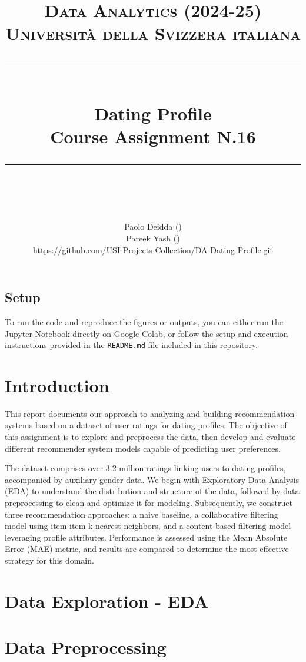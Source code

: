 \documentclass{article}
\title{
	\normalfont\normalsize
	\textsc{Data Analytics (2024-25)\\
	Universit\`a della Svizzera italiana}\\
	\rule{\linewidth}{0.5pt}\\
	{\huge Dating Profile\\
	\small Course Assignment N.16}\\
	\rule{\linewidth}{1pt}\\
	\vspace{5pt}
}
\author{
	Paolo Deidda (\text{paolo.deidda@usi.ch}) \\ 
	Pareek Yash (\text{yash.pareek@usi.ch})\\
	\url{https://github.com/USI-Projects-Collection/DA-Dating-Profile.git}
	}
\begin{document}
\maketitle

\tableofcontents


\vspace*{\fill}

\subsection*{Setup}

To run the code and reproduce the figures or outputs, you can either run the Jupyter Notebook directly on Google Colab, or follow the setup and execution instructions provided in the \texttt{README.md} file included in this repository.

\section*{Introduction}

This report documents our approach to analyzing and building recommendation systems based on a dataset of user ratings for dating profiles. The objective of this assignment is to explore and preprocess the data, then develop and evaluate different recommender system models capable of predicting user preferences.

The dataset comprises over 3.2 million ratings linking users to dating profiles, accompanied by auxiliary gender data. We begin with Exploratory Data Analysis (EDA) to understand the distribution and structure of the data, followed by data preprocessing to clean and optimize it for modeling. Subsequently, we construct three recommendation approaches: a naive baseline, a collaborative filtering model using item-item k-nearest neighbors, and a content-based filtering model leveraging profile attributes. Performance is assessed using the Mean Absolute Error (MAE) metric, and results are compared to determine the most effective strategy for this domain.


\newpage

\section{Data Exploration - EDA}


\section{Data Preprocessing}

\end{document}

